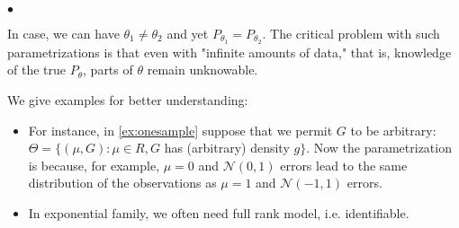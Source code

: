 \documentclass{article}
\begin{document}
 
$\bullet$ 

In  case, we can have $\theta_{1} \neq \theta_{2}$ and yet $P_{\theta_{1}}=P_{\theta_{2}}$. The critical problem with such parametrizations is that even with "infinite amounts of data," that is, knowledge of the true $P_{\theta}$, parts of $\theta$ remain unknowable. 


\begin{exma} We give examples for better understanding:
\begin{itemize}
    \item For instance, in  \cref{ex:onesample} suppose that we permit $G$ to be arbitrary: $\Theta=\{(\mu, G): \mu \in R, G$ has (arbitrary) density $g\}$. Now the parametrization is  because, for example, $\mu=0$ and $\mathcal{N}(0,1)$ errors lead to the same distribution of the observations as $\mu=1$ and $\mathcal{N}(-1,1)$ errors. 
    \item In exponential family, we often need full rank model, i.e. identifiable.
\end{itemize}
\end{exma}
\end{document}
